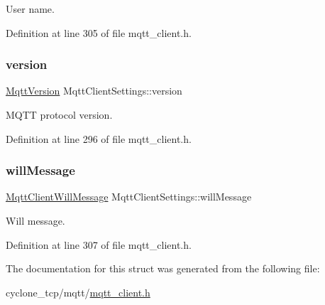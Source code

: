 User name. 



Definition at line 305 of file mqtt\+\_\+client.\+h.

\mbox{\label{structMqttClientSettings_a8f450260e9c4cecad29b2f32ed3650d9}} 
\subsubsection{\texorpdfstring{version}{version}}
{\footnotesize\ttfamily \hyperlink{mqtt__common_8h_ad475ca94d77bcab80ad53eb7b047ce57}{Mqtt\+Version} Mqtt\+Client\+Settings\+::version}



M\+Q\+TT protocol version. 



Definition at line 296 of file mqtt\+\_\+client.\+h.

\mbox{\label{structMqttClientSettings_a3366048bd998f90371fb2cddd8549aa6}} 
\subsubsection{\texorpdfstring{will\+Message}{willMessage}}
{\footnotesize\ttfamily \hyperlink{structMqttClientWillMessage}{Mqtt\+Client\+Will\+Message} Mqtt\+Client\+Settings\+::will\+Message}



Will message. 



Definition at line 307 of file mqtt\+\_\+client.\+h.



The documentation for this struct was generated from the following file\+:\begin{DoxyCompactItemize}
\item 
cyclone\+\_\+tcp/mqtt/\hyperlink{mqtt__client_8h}{mqtt\+\_\+client.\+h}\end{DoxyCompactItemize}
